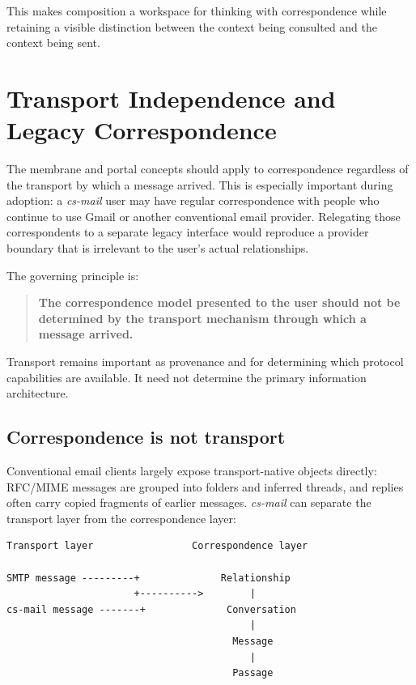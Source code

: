 \documentclass[11pt]{article}
\newcommand{\csmail}{\textit{cs-mail}}
\begin{document}
This makes composition a workspace for thinking with correspondence while retaining a visible distinction between the context being consulted and the context being sent.

\section{Transport Independence and Legacy Correspondence}
\label{sec:transport-independence}

The membrane and portal concepts should apply to correspondence regardless of the transport by which a message arrived. This is especially important during adoption: a \csmail{} user may have regular correspondence with people who continue to use Gmail or another conventional email provider. Relegating those correspondents to a separate legacy interface would reproduce a provider boundary that is irrelevant to the user's actual relationships.

The governing principle is:

\begin{quote}
\textbf{The correspondence model presented to the user should not be determined by the transport mechanism through which a message arrived.}
\end{quote}

Transport remains important as provenance and for determining which protocol capabilities are available. It need not determine the primary information architecture.

\subsection*{Correspondence is not transport}

Conventional email clients largely expose transport-native objects directly: RFC/MIME messages are grouped into folders and inferred threads, and replies often carry copied fragments of earlier messages. \csmail{} can separate the transport layer from the correspondence layer:

\begin{Verbatim}[fontsize=\small]
Transport layer                 Correspondence layer

SMTP message ---------+              Relationship
                      +---------->        |
cs-mail message -------+              Conversation
                                          |
                                       Message
                                          |
                                       Passage
\end{Verbatim}
\end{document}
